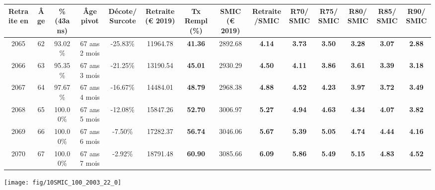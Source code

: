 \begin{adjustbox}{max width=\textwidth} 
\begin{tabular}[htb]{|c|c||c|c|c||c|c||c|c||c|c|c|c|c|} 
\hline 
 Retraite en &  Âge &  \%(43ans) &  Âge pivot &  Décote/Surcote &  Retraite (\euro{} 2019) &  Tx Rempl(\%) &  SMIC (\euro{} 2019) &  Retraite/SMIC &  R70/SMIC &  R75/SMIC &  R80/SMIC &  R85/SMIC &  R90/SMIC \\ 
\hline \hline 
 2065 &  62 &  93.02\% &  67 ans 2 mois &  -25.83\% &  11964.78 &  {\bf 41.36} &  2892.68 &  {\bf 4.14} &  {\bf 3.73} &  {\bf 3.50} &  {\bf 3.28} &  {\bf 3.07} &  {\bf 2.88} \\ 
\hline 
 2066 &  63 &  95.35\% &  67 ans 3 mois &  -21.25\% &  13190.54 &  {\bf 45.01} &  2930.29 &  {\bf 4.50} &  {\bf 4.11} &  {\bf 3.86} &  {\bf 3.61} &  {\bf 3.39} &  {\bf 3.18} \\ 
\hline 
 2067 &  64 &  97.67\% &  67 ans 4 mois &  -16.67\% &  14484.01 &  {\bf 48.79} &  2968.38 &  {\bf 4.88} &  {\bf 4.52} &  {\bf 4.23} &  {\bf 3.97} &  {\bf 3.72} &  {\bf 3.49} \\ 
\hline 
 2068 &  65 &  100.00\% &  67 ans 5 mois &  -12.08\% &  15847.26 &  {\bf 52.70} &  3006.97 &  {\bf 5.27} &  {\bf 4.94} &  {\bf 4.63} &  {\bf 4.34} &  {\bf 4.07} &  {\bf 3.82} \\ 
\hline 
 2069 &  66 &  100.00\% &  67 ans 6 mois &  -7.50\% &  17282.37 &  {\bf 56.74} &  3046.06 &  {\bf 5.67} &  {\bf 5.39} &  {\bf 5.05} &  {\bf 4.74} &  {\bf 4.44} &  {\bf 4.16} \\ 
\hline 
 2070 &  67 &  100.00\% &  67 ans 7 mois &  -2.92\% &  18791.48 &  {\bf 60.90} &  3085.66 &  {\bf 6.09} &  {\bf 5.86} &  {\bf 5.49} &  {\bf 5.15} &  {\bf 4.83} &  {\bf 4.52} \\ 
\hline 
\hline 
\end{tabular} 
\end{adjustbox} 
 
 \vspace{0.1cm} 

 {\hspace{-2.2cm}\texttt{[image: fig/10SMIC\_100\_2003\_22\_0]}} 

\newpage 
 
